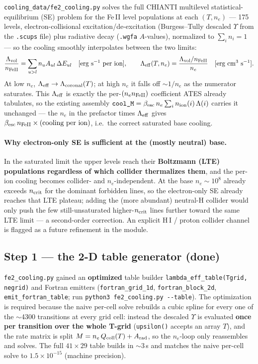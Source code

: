\documentclass[english,a4paper]{kiseon_memo}
\begin{document}
\texttt{cooling\_data/fe2\_cooling.py} solves the full CHIANTI multilevel
statistical-equilibrium (SE) problem for the Fe\,II level populations at each
\((T, n_e)\) --- 175 levels, electron-collisional excitation/de-excitation
(Burgess--Tully descaled \(\Upsilon\) from the \texttt{.scups} file) plus radiative
decay (\texttt{.wgfa} \(A\)-values), normalized to \(\sum_i n_i=1\) --- so the
cooling smoothly interpolates between the two limits:
\[
  \frac{\Lambda_{\rm vol}}{n_{\rm FeII}} = \sum_{u>l} n_u A_{ul}\,\Delta E_{ul}
  \quad[\text{erg s}^{-1}\text{ per ion}],\qquad
  \Lambda_{\rm eff}(T,n_e) = \frac{\Lambda_{\rm vol}/n_{\rm FeII}}{n_e}
  \quad[\text{erg cm}^3\text{ s}^{-1}].
\]
At low \(n_e\), \(\Lambda_{\rm eff}\to\Lambda_{\rm coronal}(T)\); at high \(n_e\) it
falls off \(\sim1/n_e\) as the numerator saturates. This \(\Lambda_{\rm eff}\) is
exactly the per-\((n_e n_{\rm FeII})\) coefficient ATES already tabulates, so the
existing assembly \(\texttt{cool\_M}=\beta_{\rm esc}\,n_e\sum_i
n_{\rm ion}(i)\,\Lambda(i)\) carries it unchanged --- the \(n_e\) in the prefactor
times \(\Lambda_{\rm eff}\) gives \(\beta_{\rm esc}\,n_{\rm FeII}\times(\text{cooling
per ion})\), i.e.\ the correct saturated base cooling.

\paragraph{Why electron-only SE is sufficient at the (mostly neutral) base.}
In the saturated limit the upper levels reach their \textbf{Boltzmann (LTE)
populations regardless of which collider thermalizes them}, and the per-ion cooling
becomes collider- and \(n_e\)-independent. At the base \(n_e\sim10^{8}\) already
exceeds \(n_{\rm crit}\) for the dominant forbidden lines, so the electron-only SE
already reaches that LTE plateau; adding the (more abundant) neutral-H collider
would only push the few still-unsaturated higher-\(n_{\rm crit}\) lines further
toward the same LTE limit --- a second-order correction. An explicit H\,I / proton
collider channel is flagged as a future refinement in the module.

\subsection{Step 1 --- the 2-D table generator (done)}

\texttt{fe2\_cooling.py} gained an \textbf{optimized} table builder
\verb|lambda_eff_table(Tgrid, negrid)| and Fortran emitters
(\verb|fortran_grid_1d|, \verb|fortran_block_2d|, \verb|emit_fortran_table|; run
\verb|python3 fe2_cooling.py --table|). The optimization is required because the
naive per-cell solve rebuilds a cubic spline for every one of the \(\sim\)4300
transitions at every grid cell: instead the descaled \(\Upsilon\) is evaluated
\textbf{once per transition over the whole T-grid} (\verb|upsilon()| accepts an
array \(T\)), and the rate matrix is split \(M = n_e\,Q_{\rm coll}(T) + A_{\rm rad}\),
so the \(n_e\)-loop only reassembles and solves. The full \(41\times29\) table
builds in \(\sim\)3\,s and matches the naive per-cell solve to \textbf{\(1.5\times
10^{-15}\)} (machine precision).
\end{document}
